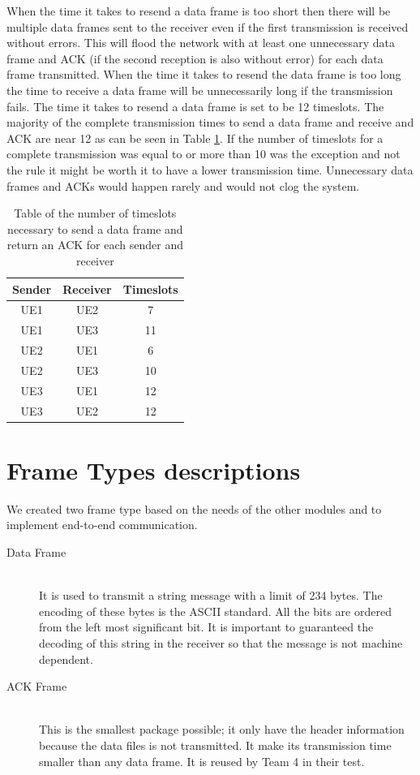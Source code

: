 When the time it takes to resend a data frame is too short then there will be multiple data frames sent to the receiver even if the first transmission is received without errors. This will flood the network with at least one unnecessary data frame and ACK (if the second reception is also without error) for each data frame transmitted. When the time it takes to resend the data frame is too long the time to receive a data frame will be unnecessarily long if the transmission fails. The time it takes to resend a data frame is set to be 12 timeslots. The majority of the complete transmission times to send a data frame and receive and ACK are near 12 as can be seen in Table \ref{tab:ACKtime}. If the number of timeslots for a complete transmission was equal to or more than 10 was the exception and not the rule it might be worth it to have a lower transmission time. Unnecessary data frames and ACKs would happen rarely and would not clog the system. 

\begin{table}[ht]
	\centering
		\begin{tabular}{| c | c | c | }
		\hline                       
		Sender & Receiver & Timeslots\\
		\hline
			UE1 & UE2 & 7\\
			UE1 & UE3 & 11\\
			UE2 & UE1 & 6\\
			UE2 & UE3 & 10\\
			UE3 & UE1 & 12\\
			UE3 & UE2 & 12\\
			
		\hline
		\end{tabular}
	\caption{Table of the number of timeslots necessary to send a data frame and return an ACK for each sender and receiver}
	\label{tab:ACKtime}
\end{table}



\section{Frame Types descriptions}
We created two frame type based on the needs of the other modules and to implement end-to-end communication.

\begin{description}
  \item[Data Frame] \hfill \\
  It is used to transmit a string message with a limit of 234 bytes. The encoding of these bytes is the ASCII standard. All the bits are ordered from the left most significant bit.
	It is important to guaranteed the decoding of this string in the receiver so that the message is not machine dependent. 
	
  \item[ACK Frame] \hfill \\
  This is the smallest package possible; it only have the header information because the data files is not transmitted. It make its transmission time smaller than any data frame. It is reused by Team 4 in their test. 
\end{description}

